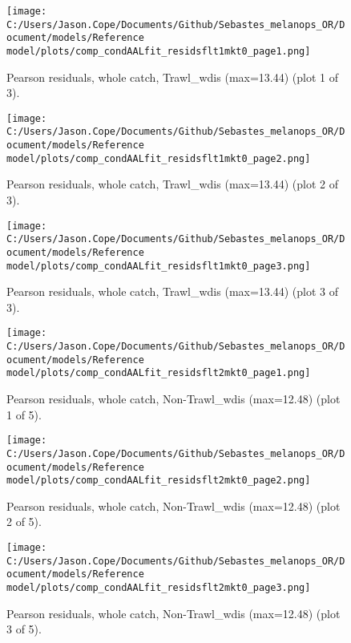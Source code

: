 \documentclass[11pt,
  english,
  letterpaper,
]{article}
\begin{document}
\begin{figure}
\centering
\texttt{[image: C:/Users/Jason.Cope/Documents/Github/Sebastes\_melanops\_OR/Document/models/Reference model/plots/comp\_condAALfit\_residsflt1mkt0\_page1.png]}
\caption{Pearson residuals, whole catch, Trawl\_wdis (max=13.44) (plot 1 of 3).\label{fig:comp_condAALfit_residsflt1mkt0_page1}}
\end{figure}

\begin{figure}
\centering
\texttt{[image: C:/Users/Jason.Cope/Documents/Github/Sebastes\_melanops\_OR/Document/models/Reference model/plots/comp\_condAALfit\_residsflt1mkt0\_page2.png]}
\caption{Pearson residuals, whole catch, Trawl\_wdis (max=13.44) (plot 2 of 3).\label{fig:comp_condAALfit_residsflt1mkt0_page2}}
\end{figure}

\begin{figure}
\centering
\texttt{[image: C:/Users/Jason.Cope/Documents/Github/Sebastes\_melanops\_OR/Document/models/Reference model/plots/comp\_condAALfit\_residsflt1mkt0\_page3.png]}
\caption{Pearson residuals, whole catch, Trawl\_wdis (max=13.44) (plot 3 of 3).\label{fig:comp_condAALfit_residsflt1mkt0_page3}}
\end{figure}

\begin{figure}
\centering
\texttt{[image: C:/Users/Jason.Cope/Documents/Github/Sebastes\_melanops\_OR/Document/models/Reference model/plots/comp\_condAALfit\_residsflt2mkt0\_page1.png]}
\caption{Pearson residuals, whole catch, Non-Trawl\_wdis (max=12.48) (plot 1 of 5).\label{fig:comp_condAALfit_residsflt2mkt0_page1}}
\end{figure}

\begin{figure}
\centering
\texttt{[image: C:/Users/Jason.Cope/Documents/Github/Sebastes\_melanops\_OR/Document/models/Reference model/plots/comp\_condAALfit\_residsflt2mkt0\_page2.png]}
\caption{Pearson residuals, whole catch, Non-Trawl\_wdis (max=12.48) (plot 2 of 5).\label{fig:comp_condAALfit_residsflt2mkt0_page2}}
\end{figure}

\begin{figure}
\centering
\texttt{[image: C:/Users/Jason.Cope/Documents/Github/Sebastes\_melanops\_OR/Document/models/Reference model/plots/comp\_condAALfit\_residsflt2mkt0\_page3.png]}
\caption{Pearson residuals, whole catch, Non-Trawl\_wdis (max=12.48) (plot 3 of 5).\label{fig:comp_condAALfit_residsflt2mkt0_page3}}
\end{figure}
\end{document}
